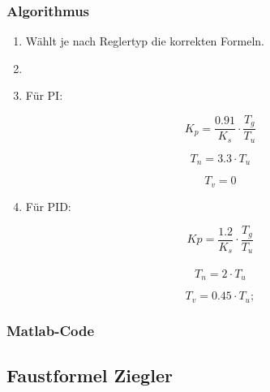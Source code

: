 \subsubsection*{Algorithmus}
\begin{enumerate}
    \item
        W\"ahlt je nach Reglertyp die korrekten Formeln.
    \item
    \item
        F\"ur PI:

        \begin{equation*}
            K_p= \frac{0.91}{K_s} \cdot \frac{T_g}{T_u}
        \end{equation*}

        \begin{equation*}
            T_n=3.3 \cdot T_u
        \end{equation*}

        \begin{equation*}
            T_v=0
        \end{equation*}
    \item
        F\"ur PID:

        \begin{equation*}
            Kp = \frac{1.2}{K_s} \cdot \frac{T_g}{T_u}
        \end{equation*}  \\

        \begin{equation*}
            T_n=2 \cdot T_u
        \end{equation*}

        \begin{equation*}
            T_v=0.45 \cdot T_u;
        \end{equation*}
\end{enumerate}

\subsubsection*{Matlab-Code}



\subsection{Faustformel Ziegler}

